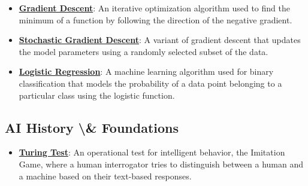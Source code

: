 \documentclass{article}%
\begin{document}
\begin{itemize}[leftmargin=*]
\item \href{https://purdue.brightspace.com/d2l/common/assets/pdfjs-d2l-dist/1.0.14-legacy/web/viewer.html?file=%2Fcontent%2Fenforced%2F1095467-wl.202510.CS.24300.001%2F05L2-ML Basics.pdf%3Fou%3D1095467&lang=en-us&container=d2l-fileviewer-rendered-pdf&fullscreen=d2l-fileviewer-rendered-pdf-dialog&height=667#page=28}{\textbf{Gradient Descent}}: An iterative optimization algorithm used to find the minimum of a function by following the direction of the negative gradient.%
\item \href{https://purdue.brightspace.com/d2l/common/assets/pdfjs-d2l-dist/1.0.14-legacy/web/viewer.html?file=%2Fcontent%2Fenforced%2F1095467-wl.202510.CS.24300.001%2F05L2-ML Basics.pdf%3Fou%3D1095467&lang=en-us&container=d2l-fileviewer-rendered-pdf&fullscreen=d2l-fileviewer-rendered-pdf-dialog&height=667#page=29}{\textbf{Stochastic Gradient Descent}}: A variant of gradient descent that updates the model parameters using a randomly selected subset of the data.%
\item \href{https://purdue.brightspace.com/d2l/common/assets/pdfjs-d2l-dist/1.0.14-legacy/web/viewer.html?file=%2Fcontent%2Fenforced%2F1095467-wl.202510.CS.24300.001%2F05L2-ML Basics.pdf%3Fou%3D1095467&lang=en-us&container=d2l-fileviewer-rendered-pdf&fullscreen=d2l-fileviewer-rendered-pdf-dialog&height=667#page=31}{\textbf{Logistic Regression}}: A machine learning algorithm used for binary classification that models the probability of a data point belonging to a particular class using the logistic function.%
\end{itemize}

%
\subsection{AI History \textbackslash{}\& Foundations}%
\label{subsec:AIHistoryFoundations}%
\begin{itemize}[leftmargin=*]%
\item \href{https://purdue.brightspace.com/d2l/common/assets/pdfjs-d2l-dist/1.0.14-legacy/web/viewer.html?file=%2Fcontent%2Fenforced%2F1095467-wl.202510.CS.24300.001%2F02L2-Intro.pdf%3Fou%3D1095467&lang=en-us&container=d2l-fileviewer-rendered-pdf&fullscreen=d2l-fileviewer-rendered-pdf-dialog&height=667#page=6}{\textbf{Turing Test}}: An operational test for intelligent behavior, the Imitation Game, where a human interrogator tries to distinguish between a human and a machine based on their text-based responses.%
\end{itemize}
\end{document}

